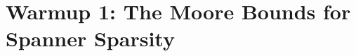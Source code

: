 \documentclass{article}\usepackage[a4paper,margin=20mm]{geometry}
\newcommand{\eps}{\varepsilon}
\begin{document}






\section{Warmup 1: The Moore Bounds for Spanner Sparsity \label{sec:moore}}
\end{document}
